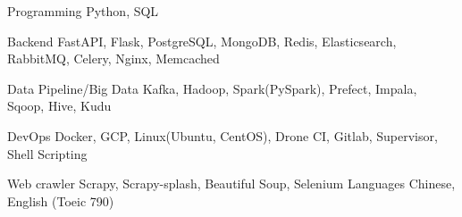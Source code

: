 

\begin{cvskills}

  \cvskill
    {Programming} %
    {Python, SQL} %

  \cvskill
    {Backend} %
    {FastAPI, Flask, PostgreSQL, MongoDB, Redis, Elasticsearch, RabbitMQ, Celery, Nginx, Memcached} %

  \cvskill
    {Data Pipeline/Big Data} %
    {Kafka, Hadoop, Spark(PySpark), Prefect, Impala, Sqoop, Hive, Kudu} %

  \cvskill
    {DevOps} %
    {Docker, GCP, Linux(Ubuntu, CentOS), Drone CI, Gitlab, Supervisor, Shell Scripting}

  \cvskill
    {Web crawler}
    {Scrapy, Scrapy-splash, Beautiful Soup, Selenium}
  \cvskill
    {Languages} %
    {Chinese, English (Toeic 790)} %

\end{cvskills}
